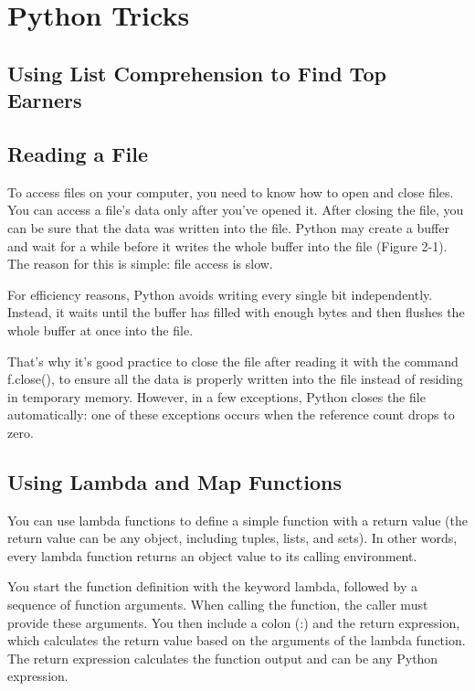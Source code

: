 \chapter{Python Tricks\label{Ch02}}
\section{Using List Comprehension to Find Top Earners}

\section{Reading a File}
To access files on your computer, you need to know how to open and close files. You can access a file's data only after you've opened it. After closing the file, you can be sure that the data was written into the file. Python may create a buffer and wait for a while before it writes the whole buffer into the file (Figure 2-1). The reason for this is simple: file access is slow.

For efficiency reasons, Python avoids writing every single bit independently. Instead, it waits until the buffer has filled with enough bytes and then flushes the whole buffer at once into the file.

That's why it's good practice to close the file after reading it with the
command f.close(), to ensure all the data is properly written into the file
instead of residing in temporary memory. However, in a few exceptions,
Python closes the file automatically: one of these exceptions occurs when
the reference count drops to zero.

\section{Using Lambda and Map Functions}
You can use lambda functions to define a simple function with a return value (the return value can be any object, including tuples, lists, and sets). In other words, every lambda function returns an object value to its calling environment. 


You start the function definition with the keyword lambda, followed by a sequence of function arguments. When calling the function, the caller must provide these arguments. You then include a colon (:) and the return expression, which calculates the return value based on the arguments of the lambda function. The return expression calculates the function output and can be any Python expression.

